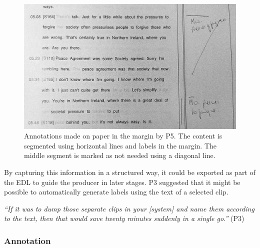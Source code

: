 \begin{figure}[h]
  \centering
  \includegraphics[width=\columnwidth]{figs/pen-annotations-p5-cropped-bw.jpg}
  \caption{Annotations made on paper in the margin by P5. The content is segmented using horizontal lines and labels in
  the margin.  The middle segment is marked as not needed using a diagonal line.}
  \label{fig:p5-annotations}
\end{figure}



By capturing this information in a structured way, it could be exported as part of the EDL to guide the producer in
later stages.  P3 suggested that it might be possible to automatically generate labels using the text of a selected
clip.

\textit{``If it was to dump those separate clips in your [system] and name them according to the text, then that would
save twenty minutes suddenly in a single go.''} (P3)


\subsubsection{Annotation}

